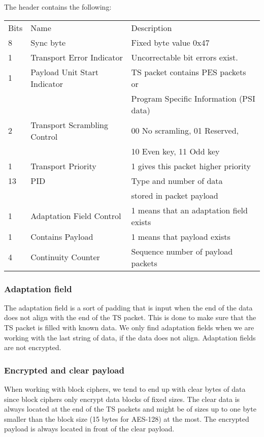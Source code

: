 The header contains the following:
\begin{longtable}{l l l}
  Bits & Name & Description \\
  8 & Sync byte & Fixed byte value 0x47 \\
  1 & Transport Error Indicator & Uncorrectable bit errors exist. \\
  1 & Payload Unit Start Indicator & TS packet contains PES packets or\\
  & & Program Specific Information (PSI data)\\
  2 & Transport Scrambling Control & 00 No scramling, 01 Reserved, \\
  & & 10 Even key, 11 Odd key \\
  1 & Transport Priority & 1 gives this packet higher priority \\
  13 & PID & Type and number of data \\
  & & stored in packet payload \\
  1 & Adaptation Field Control & 1 means that an adaptation field exists\\
    1 & Contains Payload & 1 means that payload exists \\
    4 & Continuity Counter & Sequence number of payload packets\\
\end{longtable}

\subsubsection{Adaptation field}
The adaptation field is a sort of padding that is input when the end of 
the data does not align with the end of the TS packet. This is done to 
make sure that the TS packet is filled with known data. We only find 
adaptation fields when we are working with the last string of data, if 
the data does not align. Adaptation fields are not encrypted.
\cite[pp. 10--11]{DVB:2013}

\subsubsection{Encrypted and clear payload}
When working with block ciphers, we tend to end up with clear bytes of 
data since block ciphers only encrypt data blocks of fixed sizes. The 
clear data is always located at the end of the TS packets and might be 
of sizes up to one byte smaller than the block size (15 bytes for 
AES-128) at the most. The encrypted payload is always located in front 
of the clear payload. \cite[pp. 10--11]{DVB:2013}

